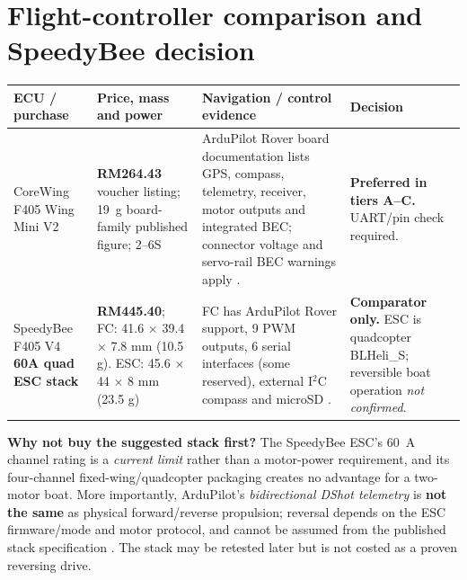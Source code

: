 \section{Flight-controller comparison and SpeedyBee decision}
\begingroup\footnotesize\begin{tabularx}{\linewidth}{L{31mm}L{34mm}Y L{25mm}}
\toprule \textbf{ECU / purchase} & \textbf{Price, mass and power} & \textbf{Navigation / control evidence} & \textbf{Decision}\\\midrule
CoreWing F405 Wing Mini V2 \cite{coreShop} & \textbf{RM264.43} voucher listing; \SI{19}{g} board-family published figure; 2--6S \cite{coreShop,coreDoc} & ArduPilot Rover board documentation lists GPS, compass, telemetry, receiver, motor outputs and integrated BEC; connector voltage and servo-rail BEC warnings apply \cite{coreDoc}. & \textbf{Preferred in tiers A--C.} UART/pin check required.\\
SpeedyBee F405 V4 \textbf{60A quad ESC stack} \cite{speedShop} & \textbf{RM445.40}; FC: 41.6 $\times$ 39.4 $\times$ 7.8 mm (10.5 g). ESC: 45.6 $\times$ 44 $\times$ 8 mm (23.5 g) \cite{speedDoc} & FC has ArduPilot Rover support, 9 PWM outputs, 6 serial interfaces (some reserved), external I$^2$C compass and microSD \cite{speedAP,speedDoc}. & \textbf{Comparator only.} ESC is quadcopter BLHeli\_S; reversible boat operation \emph{not confirmed}.\\
\bottomrule
\end{tabularx}\endgroup\par\medskip
\textbf{Why not buy the suggested stack first?} The SpeedyBee ESC's \SI{60}{A} channel rating is a \emph{current limit} rather than a motor-power requirement, and its four-channel fixed-wing/quadcopter packaging creates no advantage for a two-motor boat. More importantly, ArduPilot's \emph{bidirectional DShot telemetry} is \textbf{not the same} as physical forward/reverse propulsion; reversal depends on the ESC firmware/mode and motor protocol, and cannot be assumed from the published stack specification \cite{speedDoc,speedAP,motor}. The stack may be retested later but is not costed as a proven reversing drive.

